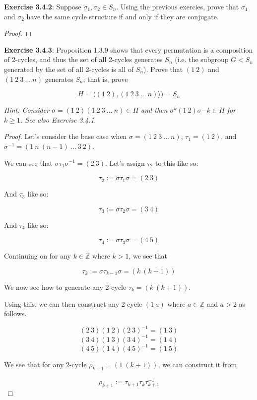 \documentclass[a4paper]{article}
\begin{document}
\begin{myparindent}{0pt}
\textbf{Exercise 3.4.2}:
Suppose $\sigma_1, \sigma_2 \in S_n$. Using the previous exercies, prove that
$\sigma_1$ and $\sigma_2$ have the same cycle structure if and only if they
are conjugate.
\begin{proof}
\end{proof}

\textbf{Exercise 3.4.3}:
Proposition 1.3.9 shows that every permutation is a composition of 2-cycles, and
thus the set of all 2-cycles generates $S_n$ (i.e. the subgroup $G < S_n$
generated by the set of all 2-cycles is all of $S_n$). Prove that $(1 ~2)$ and
$(1 ~2 ~3 ~... ~n)$ generates $S_n$; that is, prove

\[ H = \langle (1 ~2), (1 ~2 ~3 ~... ~n) \rangle) = S_n \]

\textit{Hint: Consider $\sigma = (1 ~2)(1 ~2 ~3 ~... ~n) \in H$ and then
$\sigma^k (1 ~2) \sigma{-k} \in H$ for $k \geq 1$. See also Exercise 3.4.1}.

\begin{proof}
  Let's consider the base case when $\sigma = (1 ~2 ~3 ~... ~n)$, $\tau_1 = (1 ~2)$,
  and $\sigma^{-1} = (1 ~n ~(n - 1) ~... ~3 ~2)$.

  We can see that $\sigma \tau_1 \sigma^{-1} = (2 ~3)$. Let's assign $\tau_2$ to
  this like so:

  \[ \tau_2 :=  \sigma \tau_1 \sigma = (2 ~3) \]

  And $\tau_3$ like so:

  \[ \tau_3 :=  \sigma \tau_2 \sigma = (3 ~4) \]

  And $\tau_4$ like so:

  \[ \tau_4 :=  \sigma \tau_3 \sigma = (4 ~5) \]

  Continuing on for any $k \in \mathbb{Z}$ where $k > 1$, we see that

  \[ \tau_{k} :=  \sigma \tau_{k - 1} \sigma = (k ~(k + 1)) \]

  We now see how to generate any 2-cycle $\tau_k = (k ~(k + 1))$.
  \newline

  Using this, we can then construct any 2-cycle $(1 ~a)$ where $a \in \mathbb{Z}$
  and $a > 2$ as follows.

  \[ (2 ~3) (1 ~2) (2 ~3)^{-1} = (1 ~3) \]
  \[ (3 ~4) (1 ~3) (3 ~4)^{-1} = (1 ~4) \]
  \[ (4 ~5) (1 ~4) (4 ~5)^{-1} = (1 ~5) \]

  We see that for any 2-cycle $\rho_{k + 1} = (1 ~(k + 1))$, we can construct it from

  \[ \rho_{k + 1} := \tau_{k + 1} \tau_k \tau_{k + 1}^{-1} \]


\end{proof}
\end{myparindent}
\end{document}
